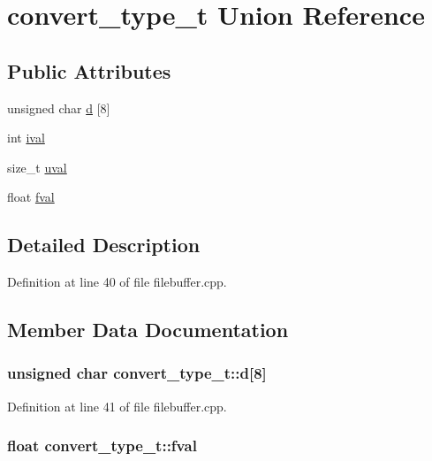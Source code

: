 \hypertarget{unionconvert__type__t}{\section{convert\-\_\-type\-\_\-t Union Reference}
\label{unionconvert__type__t}
}
\subsection*{Public Attributes}
\begin{DoxyCompactItemize}
\item 
unsigned char \hyperlink{unionconvert__type__t_a6f76840d6875059c2655f53246c5a5a1}{d} \mbox{[}8\mbox{]}
\item 
int \hyperlink{unionconvert__type__t_a9eef931dacbc2c9fe0b67edc5e053624}{ival}
\item 
size\-\_\-t \hyperlink{unionconvert__type__t_ab2a3ae21cfb1610cc473234ce3e7661e}{uval}
\item 
float \hyperlink{unionconvert__type__t_aa56281b3a5e206689c30ce623aa6dc0b}{fval}
\end{DoxyCompactItemize}


\subsection{Detailed Description}


Definition at line 40 of file filebuffer.\-cpp.



\subsection{Member Data Documentation}
\hypertarget{unionconvert__type__t_a6f76840d6875059c2655f53246c5a5a1}{
\subsubsection[{d}]{\setlength{\rightskip}{0pt plus 5cm}unsigned char convert\-\_\-type\-\_\-t\-::d\mbox{[}8\mbox{]}}}\label{unionconvert__type__t_a6f76840d6875059c2655f53246c5a5a1}


Definition at line 41 of file filebuffer.\-cpp.

\hypertarget{unionconvert__type__t_aa56281b3a5e206689c30ce623aa6dc0b}{
\subsubsection[{fval}]{\setlength{\rightskip}{0pt plus 5cm}float convert\-\_\-type\-\_\-t\-::fval}}\label{unionconvert__type__t_aa56281b3a5e206689c30ce623aa6dc0b}


